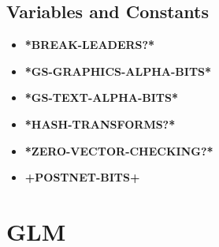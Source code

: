 \documentclass [11pt]{book}
\begin{document}
\subsection{Variables and Constants}

\label{subsec:variablesandconstants}



\begin{itemize}

\item {}
\label{prim:*break-leaders?*}
\textbf{*BREAK-LEADERS?*}





\item {}
\label{prim:*gs-graphics-alpha-bits*}
\textbf{*GS-GRAPHICS-ALPHA-BITS*}





\item {}
\label{prim:*gs-text-alpha-bits*}
\textbf{*GS-TEXT-ALPHA-BITS*}





\item {}
\label{prim:*hash-transforms?*}
\textbf{*HASH-TRANSFORMS?*}





\item {}
\label{prim:*zero-vector-checking?*}
\textbf{*ZERO-VECTOR-CHECKING?*}





\item {}
\label{prim:+postnet-bits+}
\textbf{+POSTNET-BITS+}





\end{itemize}





\section{GLM }

\label{sec:glm}
\end{document}
